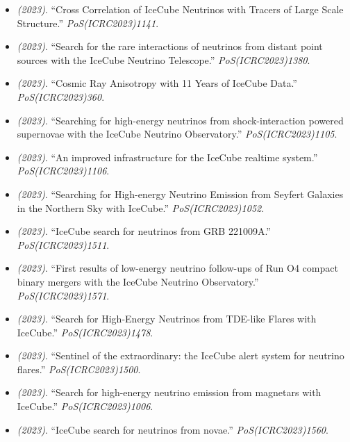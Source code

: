 \begin{itemize}
\item \textit{(2023)}. ``Cross Correlation of IceCube Neutrinos with Tracers of Large Scale Structure.'' \textit{PoS(ICRC2023)1141}.  
\item \textit{(2023)}. ``Search for the rare interactions of neutrinos from distant point sources with the IceCube Neutrino Telescope.'' \textit{PoS(ICRC2023)1380}.  
\item \textit{(2023)}. ``Cosmic Ray Anisotropy with 11 Years of IceCube Data.'' \textit{PoS(ICRC2023)360}.  
\item \textit{(2023)}. ``Searching for high-energy neutrinos from shock-interaction powered supernovae with the IceCube Neutrino Observatory.'' \textit{PoS(ICRC2023)1105}.  
\item \textit{(2023)}. ``An improved infrastructure for the IceCube realtime system.'' \textit{PoS(ICRC2023)1106}.  
\item \textit{(2023)}. ``Searching for High-energy Neutrino Emission from Seyfert Galaxies in the Northern Sky with IceCube.'' \textit{PoS(ICRC2023)1052}.  
\item \textit{(2023)}. ``IceCube search for neutrinos from GRB 221009A.'' \textit{PoS(ICRC2023)1511}.  
\item \textit{(2023)}. ``First results of low-energy neutrino follow-ups of Run O4 compact binary mergers with the IceCube Neutrino Observatory.'' \textit{PoS(ICRC2023)1571}.  
\item \textit{(2023)}. ``Search for High-Energy Neutrinos from TDE-like Flares with IceCube.'' \textit{PoS(ICRC2023)1478}.  
\item \textit{(2023)}. ``Sentinel of the extraordinary: the IceCube alert system for neutrino flares.'' \textit{PoS(ICRC2023)1500}.  
\item \textit{(2023)}. ``Search for high-energy neutrino emission from magnetars with IceCube.'' \textit{PoS(ICRC2023)1006}.  
\item \textit{(2023)}. ``IceCube search for neutrinos from novae.'' \textit{PoS(ICRC2023)1560}.  

\end{itemize}
